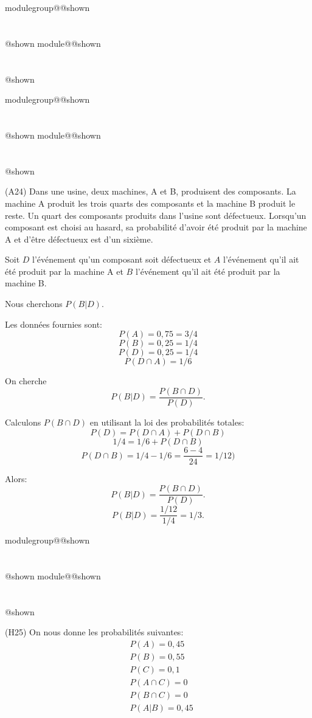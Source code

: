 \documentclass{Evaluation}
\makeatletter
\newcommand{\currentmodulekey}{}
\newcommand{\currentmoduletitle}{}
\newcommand{\currentgroupkey}{}
\newcommand{\currentgrouptitle}{}
\newcommand{\showmoduleifneeded}{%
  \ifx\currentgroupkey\empty\else
    \expandafter\ifx\csname modulegroup@\currentgroupkey @shown\endcsname\relax
      \section*{\currentgrouptitle}%
      \expandafter\gdef\csname modulegroup@\currentgroupkey @shown\endcsname{1}%
    \fi
  \fi
  \expandafter\ifx\csname module@\currentmodulekey @shown\endcsname\relax
    \section*{\currentmoduletitle}%
    \expandafter\gdef\csname module@\currentmodulekey @shown\endcsname{1}%
  \fi
}
\newenvironment{A22}{\showmoduleifneeded}{}
\newenvironment{A24}{\showmoduleifneeded}{}
\newenvironment{H25}{\showmoduleifneeded}{}
\makeatother
\begin{document}
\begin{questions}
\begin{A22}
\end{A22}

\begin{A24}
\question
(A24) 
Dans une usine, deux machines, A et B, produisent des composants. La machine A produit les trois quarts des composants et la machine B produit le reste. Un quart des composants produits dans l'usine sont défectueux. Lorsqu'un composant est choisi au hasard, sa probabilité d'avoir été produit par la machine A et d'être défectueux est d'un sixième. 

\begin{solution}
Soit \( D \) l'événement qu'un composant soit défectueux et \( A \) l'événement qu'il ait été produit par la machine A et \( B \) l'événement qu'il ait été produit par la machine B.

Nous cherchons \( P(B|D) \).

Les données fournies sont:
\[ P(A) = 0,75 = 3/4\]
\[ P(B) = 0,25 =1/4\]
\[ P(D) = 0,25 = 1/4 \]
\[ P(D \cap A) = 1/6 \]

On cherche
\[ P(B|D) = \frac{P(B \cap D)}{P(D)} .\]

Calculons \(P(B \cap D)\) en utilisant la loi des probabilités totales:
\[ P(D) = P(D\cap A)  + P(D \cap B) \]
\[ 1/4 = 1/6 + P(D \cap B) \]
\[ P(D \cap B) = 1/4 - 1/6 = \frac{6-4}{24} = 1/12) \]

Alors:
\[ P(B|D) = \frac{P(B \cap D)}{P(D)} .\]
\[ P(B|D) = \frac{1/12}{1/4} = 1/3 .\]
\end{solution}

\vspace{0.5cm}
\end{A24}

\begin{H25}
\question
(H25)  
On nous donne les probabilités suivantes:
\[
\begin{aligned}
    & P(A) = 0,45 \\
    & P(B) = 0,55 \\
    & P(C) = 0,1 \\
    & P(A\cap C) = 0 \\
    & P(B\cap C) = 0 \\
    & P(A | B) = 0,45 \\
    & 
\end{aligned}
\]


\end{H25}
\end{questions}
\end{document}
